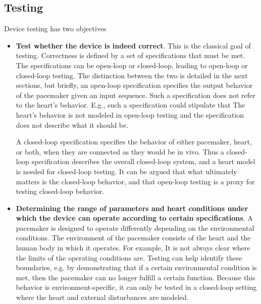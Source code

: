 \subsection{Testing}
\label{testingObjectives}

Device testing has two objectives

\begin{itemize}
	\item \textbf{Test whether the device is indeed correct}.
	This is the classical goal of testing.
	Correctness is defined by a set of specifications that must be met.	
	The specifications can be open-loop or closed-loop, leading to open-loop or closed-loop testing.
	The distinction between the two is detailed in the next sections, but briefly, an open-loop specification specifies the output behavior of the pacemaker given an input sequence.
	Such a specification does not refer to the heart's behavior.
	E.g., such a specification could stipulate that 
	The heart's behavior is not modeled in open-loop testing and the specification does not describe what it should be.
	
	A closed-loop specification specifies the behavior of either pacemaker, heart, or both, when they are connected as they would be in vivo.
	Thus a closed-loop specification describes the overall closed-loop system, and a heart model is needed for closed-loop testing.
	It can be argued that what ultimately matters is the closed-loop behavior, and that open-loop testing is a proxy for testing closed-loop behavior.
	\item \textbf{Determining the range of parameters and heart conditions under which the device can operate according to certain specifications}.
	A pacemaker is designed to operate differently depending on the environmental conditions. 
	The environment of the pacemaker consists of the heart and the human body in which it operates. 
	For example, 
	It is not always clear where the limits of the operating conditions are.
	Testing can help identify these boundaries, e.g. by demonstrating that if a certain environmental condition is met, then the pacemaker can no longer fulfill a certain function.
	Because this behavior is environment-specific, it can only be tested in a closed-loop setting where the heart and external disturbances are modeled.
\end{itemize}